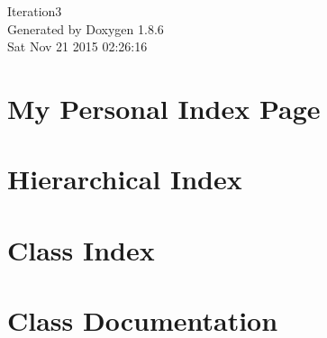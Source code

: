 \documentclass[twoside]{book}
\newcommand{\clearemptydoublepage}{%
  \newpage{\pagestyle{empty}\cleardoublepage}%
}
\begin{document}
\hypersetup{pageanchor=false}
\begin{titlepage}
\vspace*{7cm}
\begin{center}%
{\Large Iteration3 }\\
\vspace*{1cm}
{\large Generated by Doxygen 1.8.6}\\
\vspace*{0.5cm}
{\small Sat Nov 21 2015 02:26:16}\\
\end{center}
\end{titlepage}
\clearemptydoublepage
\tableofcontents
\clearemptydoublepage
{}
\hypersetup{pageanchor=true}

\chapter{My Personal Index Page}
\label{index}\hypertarget{index}{}
\chapter{Hierarchical Index}

\chapter{Class Index}

\chapter{Class Documentation}

























































\newpage
{}
{}
\printindex
\end{document}
